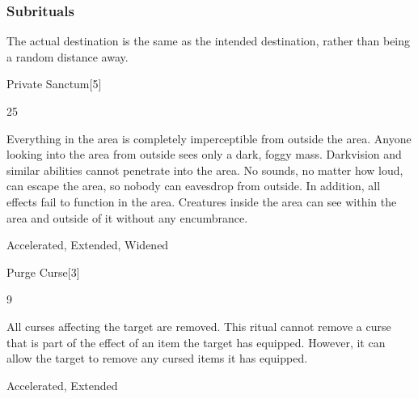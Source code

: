 \subsubsection{Subrituals}
The actual destination is the same as the intended destination, rather than being a random distance away.
\begin{spellsection}{Private Sanctum}[5]
\begin{spellcontent}
\begin{spelltargetinginfo}
 25
\end{spelltargetinginfo}
\begin{spelleffects}
\spelleffect
Everything in the area is completely imperceptible from outside the area.
Anyone looking into the area from outside sees only a dark, foggy mass.
Darkvision and similar abilities cannot penetrate into the area.
No sounds, no matter how loud, can escape the area, so nobody can eavesdrop from outside.
In addition, all  effects fail to function in the area.
Creatures inside the area can see within the area and outside of it without any encumbrance.
\end{spelleffects}
\end{spellcontent}
\begin{spellfooter}
 Accelerated, Extended, Widened
\end{spellfooter}
\begin{spellsubcontent}
\end{spellsubcontent}
\end{spellsection}
\begin{spellsection}{Purge Curse}[3]
\begin{spellcontent}
\begin{spelltargetinginfo}
 9
\end{spelltargetinginfo}
\begin{spelleffects}
\spelleffect
All curses affecting the target are removed.
This ritual cannot remove a curse that is part of the effect of an item the target has equipped.
However, it can allow the target to remove any cursed items it has equipped.
\end{spelleffects}
\end{spellcontent}
\begin{spellfooter}
 Accelerated, Extended
\end{spellfooter}
\begin{spellsubcontent}
\end{spellsubcontent}
\end{spellsection}
